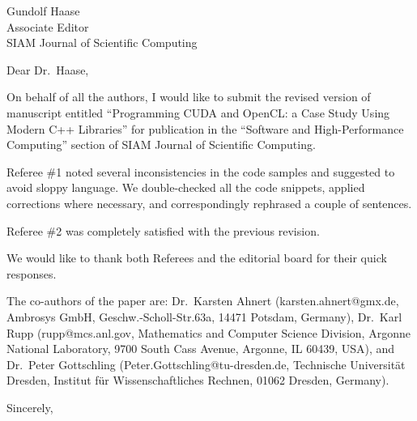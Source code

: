\documentclass[a4paper,11pt]{letter}
\begin{document}
\begin{letter}{
    Gundolf Haase\\
    Associate Editor\\
    SIAM Journal of Scientific Computing
    }
\opening{Dear Dr.~Haase,}

On behalf of all the authors, I would like to submit the revised version of
manuscript entitled ``Programming CUDA and OpenCL: a Case Study Using Modern
C++ Libraries'' for publication in the ``Software and High-Performance
Computing'' section of SIAM Journal of Scientific Computing.

Referee \#1 noted several inconsistencies in the code samples and suggested to avoid sloppy language.
We double-checked all the code snippets, applied corrections where necessary, 
and correspondingly rephrased a couple of sentences.

Referee \#2 was completely satisfied with the previous revision.

We would like to thank both Referees and the editorial board for their quick
responses.

The co-authors of the paper are: Dr.~Karsten Ahnert (karsten.ahnert@gmx.de,
Ambrosys GmbH, Geschw.-Scholl-Str.63a, 14471 Potsdam, Germany), Dr.~Karl Rupp
(rupp@mcs.anl.gov, Mathematics and Computer Science Division, Argonne National
Laboratory, 9700 South Cass Avenue, Argonne, IL 60439, USA), and Dr.~Peter
Gottschling (Peter.Gottschling@tu-dresden.de, Technische Universit\"at Dresden,
Institut f\"ur Wissenschaftliches Rechnen, 01062 Dresden, Germany).

\closing{Sincerely,}

\end{letter}
\end{document}
